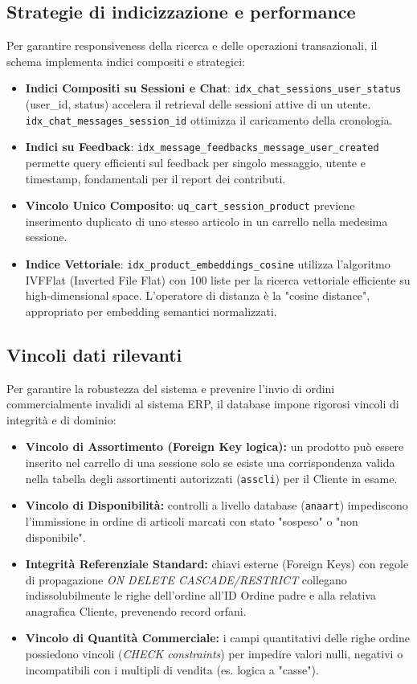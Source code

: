 \documentclass[a4paper, 11pt, oneside]{scrartcl}
\begin{document}
\subsection{Strategie di indicizzazione e performance}
Per garantire responsiveness della ricerca e delle operazioni transazionali, il schema implementa indici compositi e strategici:
\begin{itemize}
    \item \textbf{Indici Compositi su Sessioni e Chat}: \texttt{idx\_chat\_sessions\_user\_status} (user\_id, status) accelera il retrieval delle sessioni attive di un utente. \texttt{idx\_chat\_messages\_session\_id} ottimizza il caricamento della cronologia.
    \item \textbf{Indici su Feedback}: \texttt{idx\_message\_feedbacks\_message\_user\_created} permette query efficienti sul feedback per singolo messaggio, utente e timestamp, fondamentali per il report dei contributi.
    \item \textbf{Vincolo Unico Composito}: \texttt{uq\_cart\_session\_product} previene inserimento duplicato di uno stesso articolo in un carrello nella medesima sessione.
    \item \textbf{Indice Vettoriale}: \texttt{idx\_product\_embeddings\_cosine} utilizza l'algoritmo IVFFlat (Inverted File Flat) con 100 liste per la ricerca vettoriale efficiente su high-dimensional space. L'operatore di distanza è la "cosine distance", appropriato per embedding semantici normalizzati.
\end{itemize}

\subsection{Vincoli dati rilevanti}
Per garantire la robustezza del sistema e prevenire l'invio di ordini commercialmente invalidi al sistema ERP, il database impone rigorosi vincoli di integrità e di dominio:
\begin{itemize}
    \item \textbf{Vincolo di Assortimento (Foreign Key logica):} un prodotto può essere inserito nel carrello di una sessione solo se esiste una corrispondenza valida nella tabella degli assortimenti autorizzati (\texttt{asscli}) per il Cliente in esame.
    \item \textbf{Vincolo di Disponibilità:} controlli a livello database (\texttt{anaart}) impediscono l'immissione in ordine di articoli marcati con stato "sospeso" o "non disponibile".
    \item \textbf{Integrità Referenziale Standard:} chiavi esterne (Foreign Keys) con regole di propagazione \textit{ON DELETE CASCADE/RESTRICT} collegano indissolubilmente le righe dell'ordine all'ID Ordine padre e alla relativa anagrafica Cliente, prevenendo record orfani.
    \item \textbf{Vincolo di Quantità Commerciale:} i campi quantitativi delle righe ordine possiedono vincoli (\textit{CHECK constraints}) per impedire valori nulli, negativi o incompatibili con i multipli di vendita (es. logica a "casse").
\end{itemize}
\end{document}
